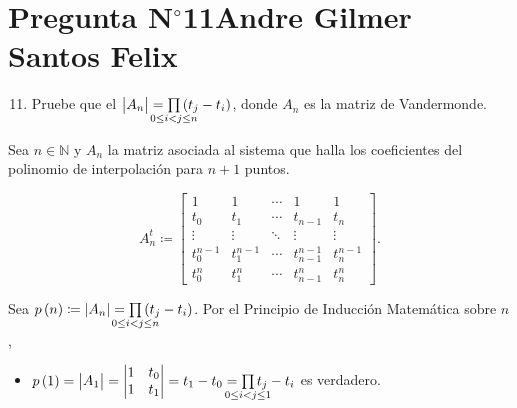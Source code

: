 \section{Pregunta N$^{\circ}$11\qquad Andre Gilmer Santos Felix}



\begin{frame}
	\begin{enumerate}\setcounter{enumi}{10}
		\item

		      Pruebe que el
		      \begin{math}
			      \begin{vmatrix}
				      A_{n}
			      \end{vmatrix}=
			      \prod\limits_{\mathclap{0\leq i< j\leq n}}
			      \left(t_{j}-t_{i}\right)
		      \end{math},
		      donde $A_{n}$ es la matriz de Vandermonde.
	\end{enumerate}

	\begin{solution}
		Sea $n\in\mathbb{N}$ y $A_{n}$ la matriz asociada al sistema
		que halla los coeficientes del polinomio de interpolación
		para $n+1$ puntos.

		\begin{equation*}
			A^{t}_{n}\coloneqq
			\begin{bmatrix}
				1         & 1         & \cdots & 1             & 1           \\
				t_0       & t_1       & \cdots & t_{n-1}       & t_{n}       \\
				\vdots    & \vdots    & \ddots & \vdots        & \vdots      \\
				t_0^{n-1} & t_1^{n-1} & \cdots & t_{n-1}^{n-1} & t_{n}^{n-1} \\
				t_0^{n}   & t_1^{n}   & \cdots & t_{n-1}^{n}   & t_{n}^{n}
			\end{bmatrix}.
		\end{equation*}

		Sea
		\begin{math}
			p\left(n\right)\coloneqq
			\left|A_{n}\right|=
			\prod\limits_{\mathclap{0\leq i< j\leq n}}
			\left(t_{j}-t_{i}\right)
		\end{math}.
		Por el \alert{Principio de Inducción Matemática} sobre $n$,

		\begin{itemize}
			\item

			      \begin{math}
				      p\left(1\right)=
				      \begin{vmatrix}
					      A_{1}
				      \end{vmatrix}=
				      \begin{vmatrix}
					      1 & t_{0} \\
					      1 & t_{1}
				      \end{vmatrix}=
				      t_{1}-t_{0}=
				      \prod\limits_{\mathclap{0\leq i< j\leq 1}}
				      t_{j}-t_{i}
			      \end{math}
			      es verdadero.


\end{itemize}
\end{solution}
\end{frame}
